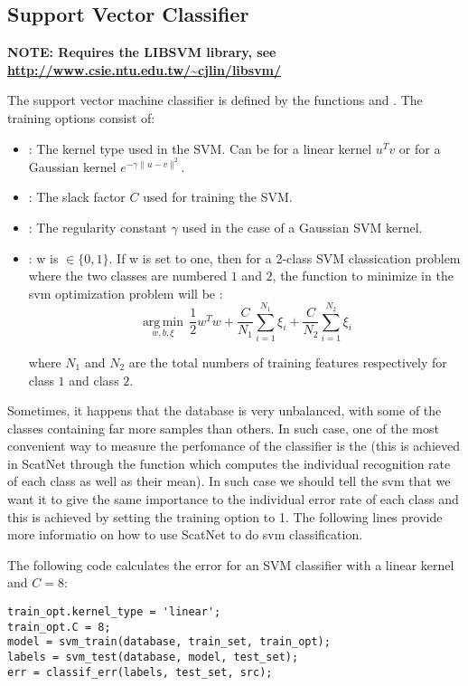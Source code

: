 \documentclass{article}
\begin{document}
\subsection{Support Vector Classifier}

\textbf{NOTE: Requires the LIBSVM library, see \url{http://www.csie.ntu.edu.tw/~cjlin/libsvm/}}

The support vector machine classifier is defined by the functions  and . The training options consist of:
\begin{itemize}
	\item {}: The kernel type used in the SVM. Can be  for a linear kernel $u^Tv$ or  for a Gaussian kernel $e^{-\gamma\|u-v\|^2}$.
	\item {}: The slack factor $C$ used for training the SVM.
	\item {}: The regularity constant $\gamma$ used in the case of a Gaussian SVM kernel.
    \item {}: w is $\in \{0,1\}$. If w is set to one, then for a 2-class SVM classication problem where the two classes are numbered $1$ and $2$, the function to minimize in the svm optimization problem will be :
    \begin{equation*}
        \operatorname*{arg\,min}_{w,b,\xi} \, \frac{1}{2}w^{T}w + \frac{C}{N_1}\sum_{i=1}^{N_1}\xi_i +  \frac{C}{N_2}\sum_{i=1}^{N_2}\xi_i
    \end{equation*}
    
    where $N_1$ and $N_2$ are the total numbers of training features respectively for class $1$ and 
    class $2$.
  \end{itemize}  
    Sometimes, it happens that the database is very unbalanced, with some of the classes containing far more samples than others. In such case, one of the most convenient way to measure the perfomance of the classifier is the  (this is achieved in ScatNet through the function  which computes the individual recognition rate of each class as well as their mean).   
    In such case we should tell the svm that we want it to give the same importance to the individual error rate of each class and this is achieved by setting the training option  to 1.
    The following lines provide more informatio on how to use ScatNet to do svm classification.

The following code calculates the error for an SVM classifier with a linear kernel and $C = 8$:
\begin{lstlisting}
train_opt.kernel_type = 'linear';
train_opt.C = 8;
model = svm_train(database, train_set, train_opt);
labels = svm_test(database, model, test_set);
err = classif_err(labels, test_set, src);
\end{lstlisting}
\end{document}
